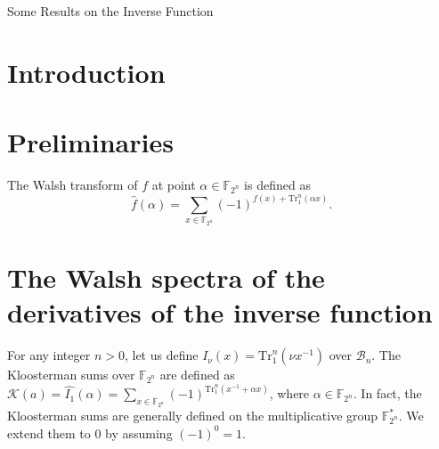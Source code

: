 \documentclass[runningheads,a4paper]{article}
\newtheorem{lemma}{Lemma}
\newcommand{\F}{\mathbb{F}}
\newcommand{\0}{\textbf{0}}
\newcommand{\1}{\textbf{1}}
\newcommand{\B}{\mathcal{B}}
\renewcommand{\Tr}{\mathrm{Tr}_1^n}
\begin{document}
\begin{center}
\Large{Some Results on the Inverse Function}
\end{center}

\begin{center}
\end{center}

\section{Introduction}

\section{Preliminaries}
The Walsh transform of $f$ at point $\alpha \in \F_{2^n}$ is defined as
\begin{equation*}
\widehat{f}(\alpha)=\sum_{x \in \F_{2^n}}(-1)^{f(x)+\Tr(\alpha x)}.
\end{equation*}




\section{The Walsh spectra of the derivatives of the inverse function}

For any integer $n>0$, let us define $I_\nu(x)=\Tr(\nu x^{-1})$ over $\B_n$.
The Kloosterman sums over $\F_{2^n}$ are defined as
$\mathcal{K}(a)=\widehat{I_1}(\alpha)=\sum_{x\in\F_{2^n}}(-1)^{\Tr(x^{-1}+\alpha x)}$, where $\alpha\in\F_{2^n}$.
In fact, the Kloosterman sums are generally defined on the multiplicative
group $\F_{2^n}^*$. We extend them to $0$ by assuming $(-1)^0=1$.
\end{document}
